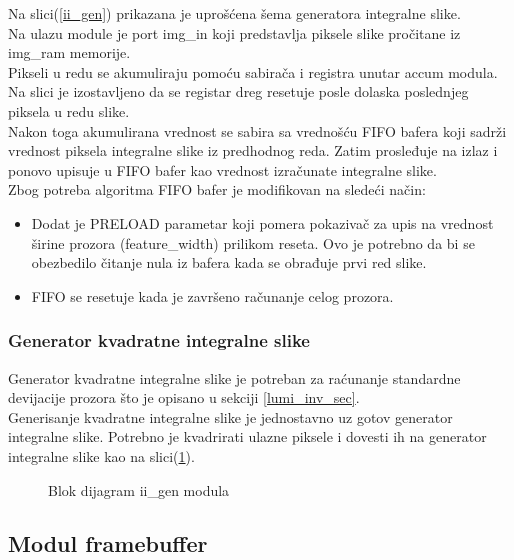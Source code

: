 Na slici(\ref{ii_gen}) prikazana je uprošćena šema generatora integralne slike.
\\

Na ulazu module je port img\_in koji predstavlja piksele slike pročitane iz
img\_ram memorije. \\

Pikseli u redu se akumuliraju pomoću sabirača i registra unutar accum modula.
Na slici je izostavljeno da se registar dreg resetuje posle dolaska poslednjeg
piksela u redu slike. \\

Nakon toga akumulirana vrednost se sabira sa vrednošću FIFO bafera koji sadrži
vrednost piksela integralne slike iz predhodnog reda.
Zatim prosleđuje na izlaz i ponovo upisuje u FIFO bafer kao vrednost izračunate
integralne slike.\\

\noindent
Zbog potreba algoritma FIFO bafer je modifikovan na sledeći način:
\begin{itemize}
  \item Dodat je PRELOAD parametar koji pomera pokazivač za upis na vrednost
    širine prozora (feature\_width) prilikom reseta. Ovo je potrebno da bi se
    obezbedilo čitanje nula iz bafera kada se obrađuje prvi red slike.
  \item FIFO se resetuje kada je završeno računanje celog prozora.
\end{itemize}

\subsubsection{Generator kvadratne integralne slike}\label{sii_gen_sec}

Generator kvadratne integralne slike je potreban za raćunanje standardne
devijacije prozora što je opisano u sekciji \ref{lumi_inv_sec}. \\
Generisanje kvadratne integralne slike je jednostavno uz gotov generator
integralne slike.
Potrebno je kvadrirati ulazne piksele i dovesti ih na generator integralne slike
kao na slici(\ref{sii_gen}).

\begin{figure}[H]
  \centering
  \scalebox{1.0}{
    
    }
\caption{Blok dijagram ii\_gen modula}
\label{sii_gen}
\end{figure}

\subsection{Modul framebuffer}

